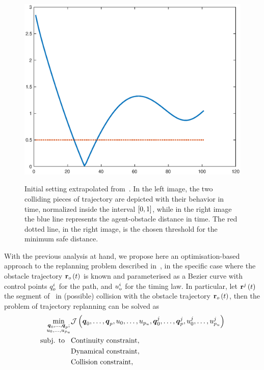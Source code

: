 \begin{figure}[!t]
\begin{center}
\begin{minipage}{.45\linewidth}
{				\includegraphics[width = 1.05\textwidth]{Figs/Chapter6/st_bezier_inital_distance_2d.eps}}
		\end{minipage}
	\end{center}
	\caption{Initial setting extrapolated from~. In the left image, the two colliding pieces of
    trajectory are depicted with their behavior in time, normalized inside the interval $\left[ 0,1 \right]$, while in the right image
    the blue line represents the agent-obstacle distance in time. The red dotted line, in the right image, is the chosen threshold
    for the minimum safe distance.}%
    \label{FIG:ST-BEZIER-2D-INITIAL}
\end{figure}
With the previous analysis at hand, we propose here an optimisation-based approach to the replanning problem described
in~, in the specific case where the obstacle trajectory $\mathbf{r}_o \left( t \right)$ is known and
parameterised as a B\acuteacc ezier curve with control points $q_o^i$ for the path, and $u_o^i$ for the timing law.
In particular, let $\mathbf{r}^j \left( t \right)$ the segment of~ in (possible) collision with
the obstacle trajectory $\mathbf{r}_o \left( t \right)$, then the problem of trajectory replanning can be solved as
\begin{equation}%
    \label{EQ:ST-SEPARATION-OPTIMISATION-PROBLEM}
    \begin{split}        
    \min_{
    \substack{\bs{\cpoint}_0, \dots, \bs{\cpoint}_{\order}; \\ \splinevar_0, \dots, \splinevar_{\order_{\splinevar}}}
    }
    & \loss
    \lp \bs{\cpoint}_0, \dots, \bs{\cpoint}_{\order}, \splinevar_0, \dots, \splinevar_{\order_{\splinevar}},
        \bs{\cpoint}^j_0, \dots, \bs{\cpoint}^j_{\order}, \splinevar^j_0, \dots, \splinevar^j_{\order_{\splinevar}} \rp \\
    \text{subj. to} \hspace{0.3cm} & \text{Continuity constraint}, \\
    & \text{Dynamical constraint}, \\
    & \text{Collision constraint},
    \end{split}
\end{equation}
